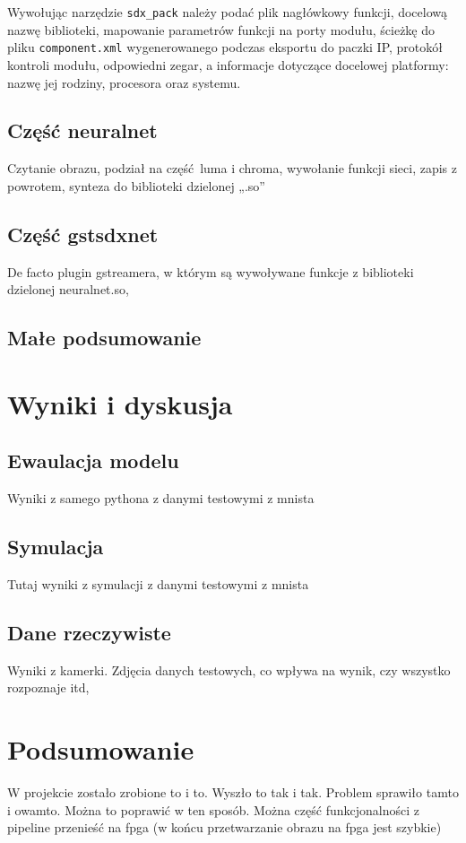 \documentclass[12pt, oneside, a4paper]{article}
\begin{document}
\begin{minipage}{\linewidth}

\end{minipage}

Wywołując narzędzie \lstinline{sdx_pack} należy podać plik nagłówkowy funkcji,
docelową nazwę biblioteki, mapowanie parametrów funkcji na porty modułu,
ścieżkę do pliku \lstinline{component.xml} wygenerowanego podczas eksportu
do paczki IP, protokół kontroli modułu, odpowiedni zegar, a informacje
dotyczące docelowej platformy: nazwę jej rodziny, procesora oraz systemu.

\subsection{Część neuralnet}
Czytanie obrazu, podział na część luma i chroma, wywołanie funkcji sieci,
zapis z powrotem, synteza do biblioteki dzielonej „.so”

\subsection{Część gstsdxnet}
De facto plugin gstreamera, w którym są wywoływane funkcje z biblioteki
dzielonej neuralnet.so, 

\subsection{Małe podsumowanie}


\newpage
\section{Wyniki i dyskusja}

\subsection{Ewaulacja modelu}
Wyniki z samego pythona z danymi testowymi z mnista

\subsection{Symulacja}
Tutaj wyniki z symulacji z danymi testowymi z mnista

\subsection{Dane rzeczywiste}
Wyniki z kamerki. Zdjęcia danych testowych, co wpływa na wynik, czy wszystko
rozpoznaje itd,

\newpage
\section{Podsumowanie}
W projekcie zostało zrobione to i to. Wyszło to tak i tak. Problem sprawiło
tamto i owamto. Można to poprawić w ten sposób. Można część funkcjonalności
z pipeline przenieść na fpga (w końcu przetwarzanie obrazu na fpga jest szybkie)
\end{document}
